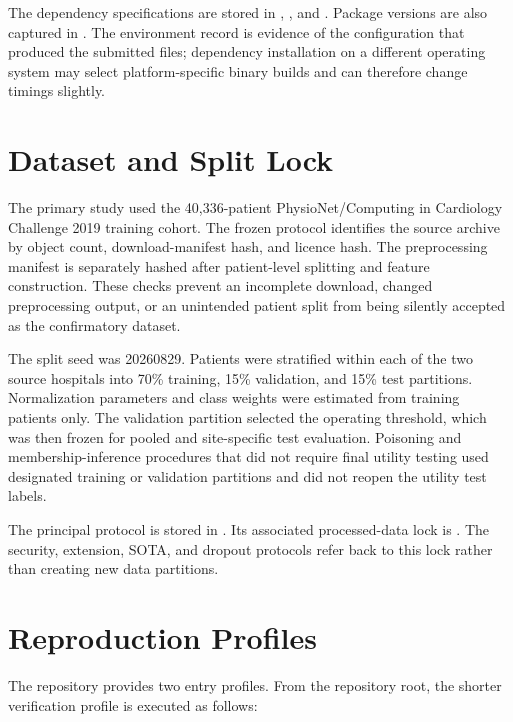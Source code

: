 The dependency specifications are stored in , , and . Package versions are also captured in . The environment record is evidence of the configuration that produced the submitted files; dependency installation on a different operating system may select platform-specific binary builds and can therefore change timings slightly.

\section{Dataset and Split Lock}
\label{appsec:dataset-lock}

The primary study used the 40,336-patient PhysioNet/Computing in Cardiology Challenge 2019 training cohort. The frozen protocol identifies the source archive by object count, download-manifest hash, and licence hash. The preprocessing manifest is separately hashed after patient-level splitting and feature construction. These checks prevent an incomplete download, changed preprocessing output, or an unintended patient split from being silently accepted as the confirmatory dataset.

The split seed was 20260829. Patients were stratified within each of the two source hospitals into 70\% training, 15\% validation, and 15\% test partitions. Normalization parameters and class weights were estimated from training patients only. The validation partition selected the operating threshold, which was then frozen for pooled and site-specific test evaluation. Poisoning and membership-inference procedures that did not require final utility testing used designated training or validation partitions and did not reopen the utility test labels.

The principal protocol is stored in . Its associated processed-data lock is . The security, extension, SOTA, and dropout protocols refer back to this lock rather than creating new data partitions.

\section{Reproduction Profiles}
\label{appsec:reproduction-profiles}

The repository provides two entry profiles. From the repository root, the shorter verification profile is executed as follows:

